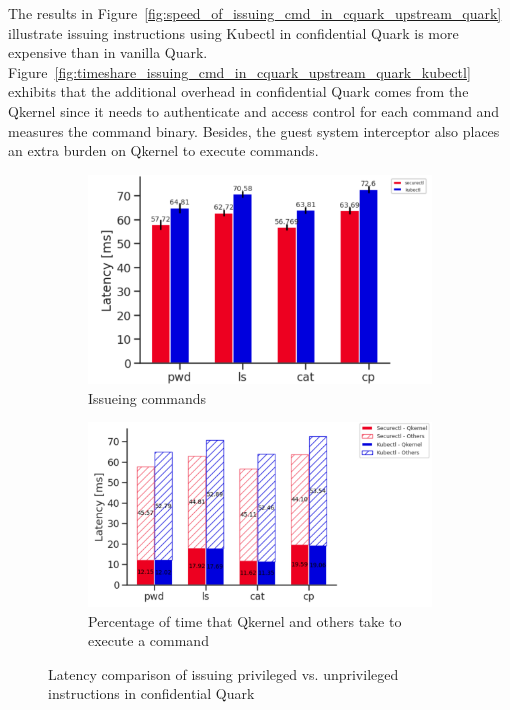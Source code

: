 The results in Figure~\ref{fig:speed_of_issuing_cmd_in_cquark_upstream_quark} illustrate issuing instructions using Kubectl in confidential Quark is more expensive than in vanilla Quark. Figure~\ref{fig:timeshare_issuing_cmd_in_cquark_upstream_quark_kubectl} exhibits that the additional overhead in confidential Quark comes from the Qkernel since it needs to authenticate and access control for each 
command and measures the command binary. Besides, the guest system interceptor also places an extra burden on Qkernel to execute commands.



\begin{figure}[!htb] 
    \begin{subfigure}[b]{0.5\linewidth}
      \centering
      \centering
      \includegraphics[width=1\textwidth]{images/speed_of_issuing_cmd_in_cquark_kubctl_securectl.png} %
      \caption{Issueing commands}
      \label{fig:speed_of_issuing_cmd_in_cquark_kubctl_securectl}
      \vspace{4ex}
    \end{subfigure}%
    \begin{subfigure}[b]{0.5\linewidth}
      \centering
      \includegraphics[width=1\textwidth]{images/timeshare_issuing_cmd_in_cquark_kubectl_securectl.png} %
      \caption{Percentage of time that Qkernel and others take to execute a command}
      \label{fig:timeshare_issuing_cmd_in_cquark_kubectl_securectl}
      \vspace{4ex}
    \end{subfigure} 
    \caption{Latency comparison of issuing privileged vs. unprivileged instructions in confidential Quark}
    \label{fig9} 
\end{figure}



